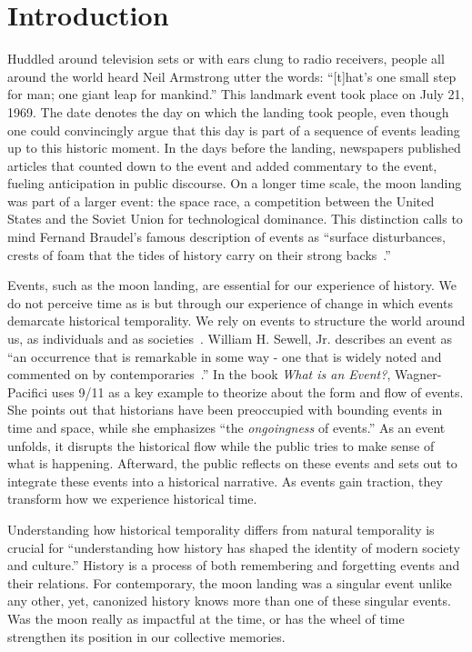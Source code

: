 \documentclass[]{ceurart}
\begin{document}
\section{Introduction}
Huddled around television sets or with ears clung to radio receivers, people all around the world heard Neil Armstrong utter the words: ``[t]hat's one small step for man; one giant leap for mankind.'' This landmark event took place on July 21, 1969. The date denotes the day on which the landing took people, even though one could convincingly argue that this day is part of a sequence of events leading up to this historic moment. In the days before the landing, newspapers published articles that counted down to the event and added commentary to the event, fueling anticipation in public discourse. On a longer time scale, the moon landing was part of a larger event: the space race, a competition between the United States and the Soviet Union for technological dominance. This distinction calls to mind Fernand Braudel's famous description of events as ``surface disturbances, crests of foam that the tides of history carry on their strong backs~\cite{braudel_1995}.''

Events, such as the moon landing, are essential for our experience of history. We do not perceive time as is but through our experience of change in which events demarcate historical temporality. We rely on events to structure the world around us, as individuals and as societies~\cite{wagner-pacificiWhatEvent2017}. William H. Sewell, Jr. describes an event as ``an occurrence that is remarkable in some way - one that is widely noted and commented on by contemporaries~\cite{sewell_historical_1996}.''
In the book \textit{What is an Event?}, Wagner-Pacifici uses 9/11 as a key example to theorize about the form and flow of events. She points out that historians have been preoccupied with bounding events in time and space, while she emphasizes ``the \textit{ongoingness} of events.'' As an event unfolds, it disrupts the historical flow while the public tries to make sense of what is happening. Afterward, the public reflects on these events and sets out to integrate these events into a historical narrative. As events gain traction, they transform how we experience historical time.

Understanding how historical temporality differs from natural temporality is crucial for ``understanding how history has shaped the identity of modern society and culture.\cite{koselleck_futures_2004}'' History is a process of both remembering and forgetting events and their relations. For contemporary, the moon landing was a singular event unlike any other, yet, canonized history knows more than one of these singular events. Was the moon really as impactful at the time, or has the wheel of time strengthen its position in our collective memories.
\end{document}

